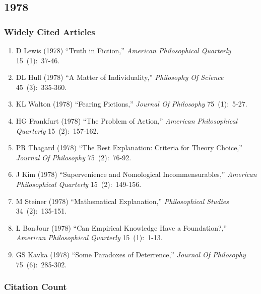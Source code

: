 \documentclass[
  10pt,
  letterpaper,
  DIV=11,
  numbers=noendperiod,
  twoside]{scrartcl}
\providecommand{\tightlist}{%
  \setlength{\itemsep}{0pt}\setlength{\parskip}{0pt}}\usepackage{longtable,booktabs,array}
\begin{document}
\newpage

\subsection{1978}\label{sec-s1978}

\subsubsection*{Widely Cited Articles}\label{widely-cited-articles-22}

\begin{enumerate}
\def\labelenumi{\arabic{enumi}.}
\tightlist
\item
  D Lewis (1978) ``Truth in Fiction,'' \emph{American Philosophical
  Quarterly} 15~(1):~37-46.
\item
  DL Hull (1978) ``A Matter of Individuality,'' \emph{Philosophy Of
  Science} 45~(3):~335-360.
\item
  KL Walton (1978) ``Fearing Fictions,'' \emph{Journal Of Philosophy}
  75~(1):~5-27.
\item
  HG Frankfurt (1978) ``The Problem of Action,'' \emph{American
  Philosophical Quarterly} 15~(2):~157-162.
\item
  PR Thagard (1978) ``The Best Explanation: Criteria for Theory
  Choice,'' \emph{Journal Of Philosophy} 75~(2):~76-92.
\item
  J Kim (1978) ``Supervenience and Nomological Incommensurables,''
  \emph{American Philosophical Quarterly} 15~(2):~149-156.
\item
  M Steiner (1978) ``Mathematical Explanation,'' \emph{Philosophical
  Studies} 34~(2):~135-151.
\item
  L BonJour (1978) ``Can Empirical Knowledge Have a Foundation?,''
  \emph{American Philosophical Quarterly} 15~(1):~1-13.
\item
  GS Kavka (1978) ``Some Paradoxes of Deterrence,'' \emph{Journal Of
  Philosophy} 75~(6):~285-302.
\end{enumerate}

\subsubsection*{Citation Count}\label{sec-count-1978}
\end{document}
